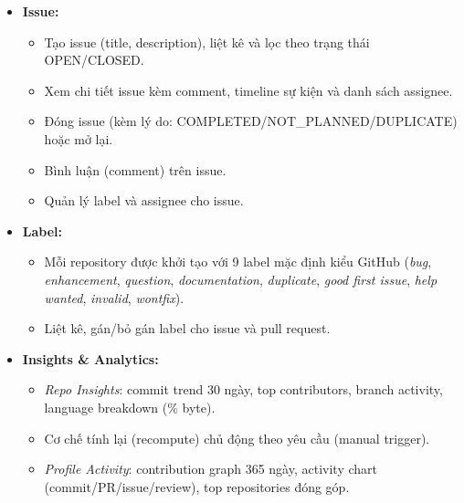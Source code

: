 \begin{itemize}
\begin{itemize}
  \item So sánh hai branch (compare): hiển thị danh sách commit, file thay đổi và summary (commit count, files changed, additions, deletions).
  \item Tạo pull request từ kết quả so sánh; gán title, description, source/target branch.
  \item Liệt kê pull request của repo, lọc theo trạng thái OPEN/MERGED/CLOSED.
  \item Xem chi tiết pull request kèm timeline sự kiện (event log: created, merged, closed, reopened, commented\ldots).
  \item Merge pull request: hệ thống tự kiểm tra xung đột; nếu sạch, thực hiện merge với commit message tuỳ chỉnh; nếu có xung đột, chuyển sang luồng resolve conflict.
  \item Revert pull request đã merge (tạo branch revert và commit revert tự động).
  \item Đóng (close) hoặc mở lại (reopen) pull request.
  \item Quản lý label và assignee cho pull request.
  \end{itemize}
\item \textbf{Issue:}
  \begin{itemize}
  \item Tạo issue (title, description), liệt kê và lọc theo trạng thái OPEN/CLOSED.
  \item Xem chi tiết issue kèm comment, timeline sự kiện và danh sách assignee.
  \item Đóng issue (kèm lý do: COMPLETED/NOT\_PLANNED/DUPLICATE) hoặc mở lại.
  \item Bình luận (comment) trên issue.
  \item Quản lý label và assignee cho issue.
  \end{itemize}
\item \textbf{Label:}
  \begin{itemize}
  \item Mỗi repository được khởi tạo với 9 label mặc định kiểu GitHub (\textit{bug}, \textit{enhancement}, \textit{question}, \textit{documentation}, \textit{duplicate}, \textit{good first issue}, \textit{help wanted}, \textit{invalid}, \textit{wontfix}).
  \item Liệt kê, gán/bỏ gán label cho issue và pull request.
  \end{itemize}
\item \textbf{Insights \& Analytics:}
  \begin{itemize}
  \item \textit{Repo Insights}: commit trend 30 ngày, top contributors, branch activity, language breakdown (\% byte).
  \item Cơ chế tính lại (recompute) chủ động theo yêu cầu (manual trigger).
  \item \textit{Profile Activity}: contribution graph 365 ngày, activity chart (commit/PR/issue/review), top repositories đóng góp.
  \end{itemize}
\end{itemize}


